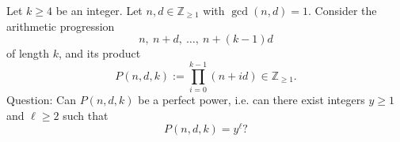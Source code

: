 Let $k\ge 4$ be an integer. Let $n,d\in\mathbb Z_{\ge 1}$ with $\gcd(n,d)=1$. Consider the arithmetic progression
\[
 n,\ n+d,\ \dots,\ n+(k-1)d
\]
of length $k$, and its product
\[
 P(n,d,k):=\prod_{i=0}^{k-1}(n+id)\in\mathbb Z_{\ge 1}.
\]
Question: Can $P(n,d,k)$ be a perfect power, i.e. can there exist integers $y\ge 1$ and $\ell\ge 2$ such that
\[
 P(n,d,k)=y^{\ell}?
\]
